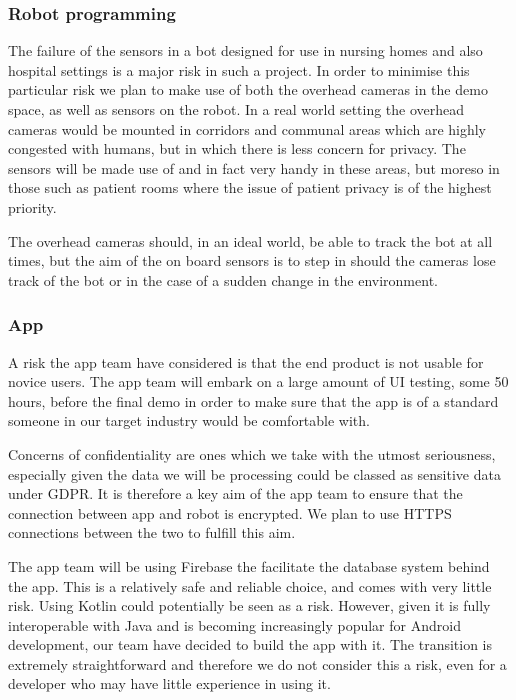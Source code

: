 \documentclass{article}
\begin{document}
\subsubsection{Robot programming}

The failure of the sensors in a bot designed for use in nursing homes and also hospital settings is a major risk in such a project. In order to minimise this particular risk we plan to make use of both the overhead cameras in the demo space, as well as sensors on the robot. In a real world setting the overhead cameras would be mounted in corridors and communal areas which are highly congested with humans, but in which there is less concern for privacy. The sensors will be made use of and in fact very handy in these areas, but moreso in those such as patient rooms where the issue of patient privacy is of the highest priority.

The overhead cameras should, in an ideal world, be able to track the bot at all times, but the aim of the on board sensors is to step in should the cameras lose track of the bot or in the case of a sudden change in the environment.

\subsubsection{App}

A risk the app team have considered is that the end product is not usable for novice users. The app team will embark on a large amount of UI testing, some 50 hours, before the final demo in order to make sure that the app is of a standard someone in our target industry would be comfortable with.

Concerns of confidentiality are ones which we take with the utmost seriousness, especially given the data we will be processing could be classed as sensitive data under GDPR. It is therefore a key aim of the app team to ensure that the connection between app and robot is encrypted. We plan to use HTTPS connections between the two to fulfill this aim.

The app team will be using Firebase the facilitate the database system behind the app. This is a relatively safe and reliable choice, and comes with very little risk. Using Kotlin could potentially be seen as a risk. However, given it is fully interoperable with Java and is becoming increasingly popular for Android development, our team have decided to build the app with it. The transition is extremely straightforward and therefore we do not consider this a risk, even for a developer who may have little experience in using it.
\end{document}
